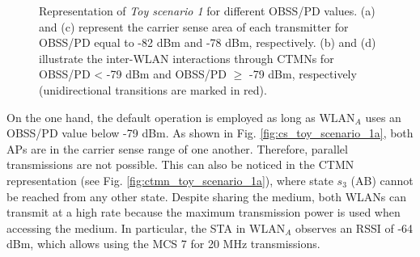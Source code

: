 \documentclass[comsoc]{IEEEtran}
\begin{document}
\begin{figure}[h!]
		\caption{Representation of \emph{Toy scenario 1 }for different OBSS/PD values. (a) and (c) represent the carrier sense area of each transmitter for OBSS/PD equal to -82 dBm and -78 dBm, respectively. (b) and (d) illustrate the inter-WLAN interactions through CTMNs for OBSS/PD < -79 dBm and OBSS/PD $\geq$ -79 dBm, respectively (unidirectional transitions are marked in red).}
		\label{fig:toy_scenario_1b}
	\end{figure}
	
	On the one hand, the default operation is employed as long as $\text{WLAN}_A$ uses an OBSS/PD value below -79 dBm. As shown in Fig. \ref{fig:cs_toy_scenario_1a}, both APs are in the carrier sense range of one another. Therefore, parallel transmissions are not possible. This can also be noticed in the CTMN representation (see Fig. \ref{fig:ctmn_toy_scenario_1a}), where state $s_3$ (AB) cannot be reached from any other state. Despite sharing the medium, both WLANs can transmit at a high rate because the maximum transmission power is used when accessing the medium. In particular, the STA in $\text{WLAN}_A$ observes an RSSI of -64 dBm, which allows using the MCS 7 for 20 MHz transmissions.
	
\end{document}
